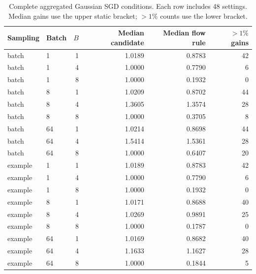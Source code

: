 \begin{table}[h]\centering\small
\caption{Complete aggregated Gaussian SGD conditions. Each row includes 48 settings. Median gains use the upper static bracket; $>1\%$ counts use the lower bracket.}
\begin{tabular}{llrrrr}\toprule Sampling & Batch & $B$ & Median candidate & Median flow rule & $>1\%$ gains\\\midrule
batch & 1 & 1 & 1.0189 & 0.8783 & 42 \\
batch & 1 & 4 & 1.0000 & 0.7790 & 6 \\
batch & 1 & 8 & 1.0000 & 0.1932 & 0 \\
batch & 8 & 1 & 1.0209 & 0.8702 & 44 \\
batch & 8 & 4 & 1.3605 & 1.3574 & 28 \\
batch & 8 & 8 & 1.0000 & 0.3705 & 8 \\
batch & 64 & 1 & 1.0214 & 0.8698 & 44 \\
batch & 64 & 4 & 1.5414 & 1.5361 & 28 \\
batch & 64 & 8 & 1.0000 & 0.6407 & 20 \\
example & 1 & 1 & 1.0189 & 0.8783 & 42 \\
example & 1 & 4 & 1.0000 & 0.7790 & 6 \\
example & 1 & 8 & 1.0000 & 0.1932 & 0 \\
example & 8 & 1 & 1.0171 & 0.8688 & 40 \\
example & 8 & 4 & 1.0269 & 0.9891 & 25 \\
example & 8 & 8 & 1.0000 & 0.1787 & 0 \\
example & 64 & 1 & 1.0169 & 0.8682 & 40 \\
example & 64 & 4 & 1.1633 & 1.1627 & 28 \\
example & 64 & 8 & 1.0000 & 0.1844 & 5 \\
\bottomrule\end{tabular}\end{table}

